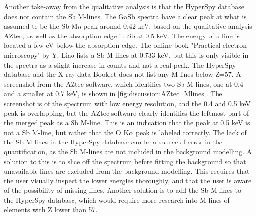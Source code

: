 Another take-away from the qualitative analysis is that the HyperSpy database does not contain the Sb M-lines.
The GaSb spectra have a clear peak at what is assumed to be the Sb M$\eta$ peak around 0.42 keV, based on the qualitative analysis AZtec, as well as the absorption edge in Sb at 0.5 keV.
The energy of a line is located a few eV below the absorption edge.
The online book "Practical electron microscopy" by Y. Liao \cite{liao2006practical} lists a Sb M lines at 0.733 keV, but this is only visible in the spectra as a slight increase in counts and not a real peak.
The HyperSpy database and the X-ray data Booklet \cite{thompson_x-ray_2004} does not list any M-lines below Z=57.
A screenshot from the AZtec software, which identifies two Sb M-lines, one at 0.4 and a smaller at 0.7 keV, is shown in \cref{fig:discussion:AZtec_Mlines}.
The screenshot is of the spectrum with low energy resolution, and the 0.4 and 0.5 keV peak is overlapping, but the AZtec software clearly identifies the leftmost part of the merged peak as a Sb M-line.
This is an indication that the peak at 0.5 keV is not a Sb M-line, but rather that the O K$\alpha$ peak is labeled correctly.
The lack of the Sb M-lines in the HyperSpy database can be a source of error in the quantification, as the Sb M-lines are not included in the background modelling.
A solution to this is to slice off the spectrum before fitting the background so that unavailable lines are excluded from the background modelling.
This requires that the user visually inspect the lower energies thoroughly, and that the user is aware of the possibility of missing lines.
Another solution is to add the Sb M-lines to the HyperSpy database, which would require more research into M-lines of elements with Z lower than 57.

